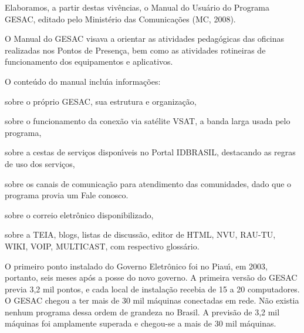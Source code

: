 \documentclass[
12pt,		%
openright,	%
twoside,  %
a4paper,			%
chapter=TITLE,		%
english,			%
french,				%
spanish,			%
brazil				%
]{USPSC-classe/USPSC}
\begin{document}
Elaboramos, a partir destas viv\^encias, o Manual do Usu\'ario do Programa GESAC, editado pelo Minist\'erio das Comunica\c{c}\~oes (MC, 2008).










O Manual do GESAC visava a orientar as atividades pedag\'ogicas das oficinas realizadas nos Pontos de Presen\c{c}a, bem como as  atividades rotineiras de funcionamento dos equipamentos e aplicativos.










O conte\'udo do manual inclu\'{\i}a informa\c{c}\~oes:











\begin{alineas}
\item sobre o pr\'oprio GESAC, sua estrutura e organiza\c{c}\~ao,
\item sobre o funcionamento da conex\~ao via sat\'elite VSAT, a banda larga usada pelo programa,
\item sobre a cestas de servi\c{c}os dispon\'{\i}veis no Portal IDBRASIL, destacando as regras de uso dos servi\c{c}os,
\item sobre os canais de comunica\c{c}\~ao para atendimento das comunidades, dado que o programa provia um \textquotedbl Fale conosco\textquotedbl .
\item sobre o correio eletr\^onico disponibilizado,
\item sobre a TEIA, blogs, listas de discuss\~ao, editor de HTML, NVU, RAU-TU, WIKI, VOIP, MULTICAST, com respectivo gloss\'ario.
\end{alineas}

O primeiro ponto instalado do Governo Eletr\^onico foi no Piau\'{\i}, em 2003, portanto, seis meses ap\'os a posse do novo governo. A primeira vers\~ao do GESAC previa 3,2 mil pontos, e cada local de instala\c{c}\~ao recebia de 15 a 20 computadores. O GESAC chegou a ter mais de 30 mil m\'aquinas conectadas em rede. N\~ao existia nenhum programa dessa ordem de grandeza no Brasil. A previs\~ao de 3,2 mil m\'aquinas foi amplamente superada e chegou-se a mais de 30 mil m\'aquinas.
\end{document}
